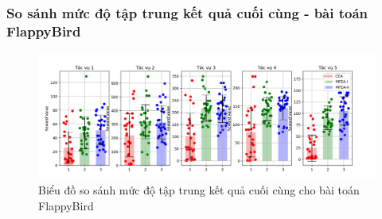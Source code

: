 \subsubsection{So sánh mức độ tập trung kết quả cuối cùng - bài toán FlappyBird}
\begin{figure}[h!]
    \centering
    \includegraphics[width=\textwidth,height=\textheight,keepaspectratio]{thesis/images/results/rl/flappybird_final.png}
    \caption{Biểu đồ so sánh mức độ tập trung kết quả cuối cùng cho bài toán FlappyBird}
    \label{fig:FLP}
\end{figure}